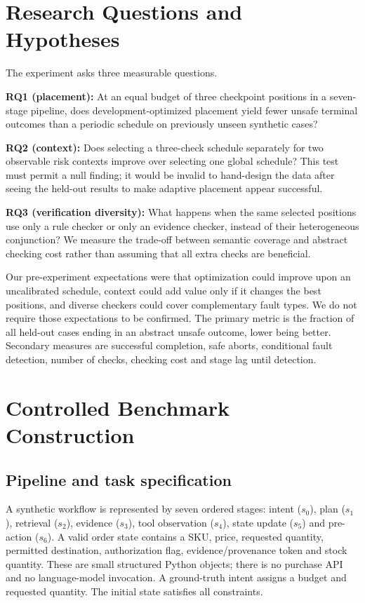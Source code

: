 \documentclass[conference]{IEEEtran}
\begin{document}
\section{Research Questions and Hypotheses}
The experiment asks three measurable questions.

\textbf{RQ1 (placement):} At an equal budget of three checkpoint positions in a seven-stage pipeline, does development-optimized placement yield fewer unsafe terminal outcomes than a periodic schedule on previously unseen synthetic cases?

\textbf{RQ2 (context):} Does selecting a three-check schedule separately for two observable risk contexts improve over selecting one global schedule? This test must permit a null finding; it would be invalid to hand-design the data after seeing the held-out results to make adaptive placement appear successful.

\textbf{RQ3 (verification diversity):} What happens when the same selected positions use only a rule checker or only an evidence checker, instead of their heterogeneous conjunction? We measure the trade-off between semantic coverage and abstract checking cost rather than assuming that all extra checks are beneficial.

Our pre-experiment expectations were that optimization could improve upon an uncalibrated schedule, context could add value only if it changes the best positions, and diverse checkers could cover complementary fault types. We do not require those expectations to be confirmed. The primary metric is the fraction of all held-out cases ending in an abstract unsafe outcome, lower being better. Secondary measures are successful completion, safe aborts, conditional fault detection, number of checks, checking cost and stage lag until detection.

\section{Controlled Benchmark Construction}
\subsection{Pipeline and task specification}
A synthetic workflow is represented by seven ordered stages: intent ($s_0$), plan ($s_1$), retrieval ($s_2$), evidence ($s_3$), tool observation ($s_4$), state update ($s_5$) and pre-action ($s_6$). A valid order state contains a SKU, price, requested quantity, permitted destination, authorization flag, evidence/provenance token and stock quantity. These are small structured Python objects; there is no purchase API and no language-model invocation. A ground-truth intent assigns a budget and requested quantity. The initial state satisfies all constraints.
\end{document}
